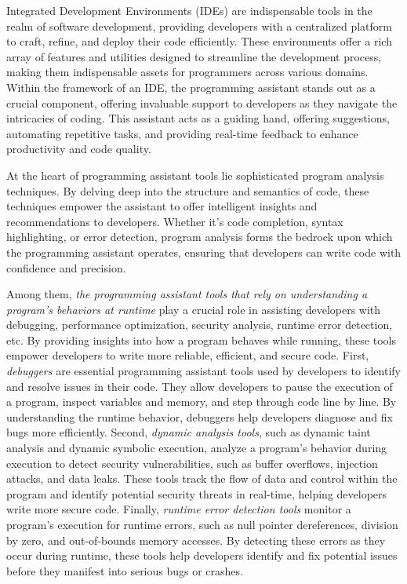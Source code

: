 Integrated Development Environments (IDEs) are indispensable tools in the realm of software development, providing developers with a centralized platform to craft, refine, and deploy their code efficiently. These environments offer a rich array of features and utilities designed to streamline the development process, making them indispensable assets for programmers across various domains. Within the framework of an IDE, the programming assistant stands out as a crucial component, offering invaluable support to developers as they navigate the intricacies of coding. This assistant acts as a guiding hand, offering suggestions, automating repetitive tasks, and providing real-time feedback to enhance productivity and code quality.

At the heart of programming assistant tools lie sophisticated program analysis techniques. By delving deep into the structure and semantics of code, these techniques empower the assistant to offer intelligent insights and recommendations to developers. Whether it's code completion, syntax highlighting, or error detection, program analysis forms the bedrock upon which the programming assistant operates, ensuring that developers can write code with confidence and precision.

Among them, {\em the programming assistant tools that rely on
understanding a program's behaviors at runtime} play a crucial role in
assisting developers with debugging, performance optimization,
security analysis, runtime error detection, etc. By providing insights
into how a program behaves while running, these tools empower
developers to write more reliable, efficient, and secure code. First,
{\em debuggers} are essential programming assistant tools used by
developers to identify and resolve issues in their code. They allow
developers to pause the execution of a program, inspect variables and
memory, and step through code line by line. By understanding the
runtime behavior, debuggers help developers diagnose and
fix bugs more efficiently.
Second, {\em dynamic analysis tools}, such as dynamic taint analysis
and dynamic symbolic execution, analyze a program's behavior during
execution to detect security vulnerabilities, such as buffer
overflows, injection attacks, and data leaks. These tools track the
flow of data and control within the program and identify potential
security threats in real-time, helping developers write more secure
code. Finally, {\em runtime error detection tools} monitor a program's
execution for runtime errors, such as null pointer dereferences,
division by zero, and out-of-bounds memory accesses. By detecting
these errors as they occur during runtime, these tools help developers
identify and fix potential issues before they manifest into serious
bugs or crashes.

